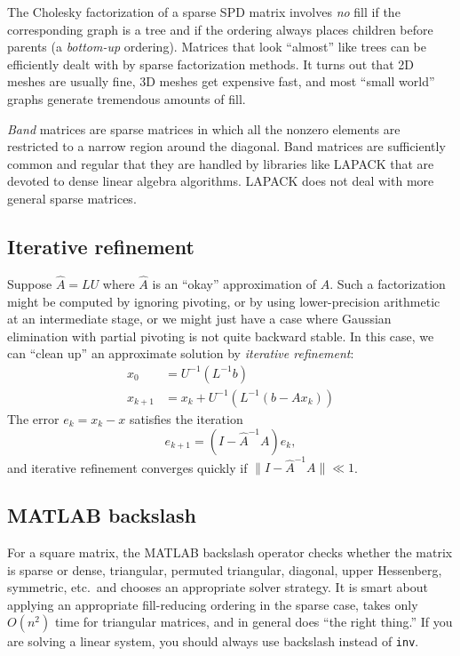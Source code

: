 \documentclass[12pt, leqno]{article}
\begin{document}
The Cholesky factorization of a sparse SPD matrix involves {\em no}
fill if the corresponding graph is a tree and if the ordering
always places children before parents (a {\em bottom-up} ordering).
Matrices that look ``almost'' like trees can be efficiently dealt
with by sparse factorization methods.  It turns out that 2D meshes
are usually fine, 3D meshes get expensive fast, and most ``small
world'' graphs generate tremendous amounts of fill.

{\em Band} matrices are sparse matrices in which all the nonzero
elements are restricted to a narrow region around the diagonal.
Band matrices are sufficiently common and regular that they are
handled by libraries like LAPACK that are devoted to dense linear
algebra algorithms.  LAPACK does not deal with more general sparse
matrices.

\subsection{Iterative refinement}

Suppose $\hat{A} = LU$ where $\hat{A}$ is an ``okay'' approximation
of $A$.  Such a factorization might be computed by ignoring pivoting,
or by using lower-precision arithmetic at an intermediate stage,
or we might just have a case where Gaussian elimination with partial
pivoting is not quite backward stable.  In this case, we can ``clean
up'' an approximate solution by {\em iterative refinement}:
\begin{align*}
x_0 &= U^{-1} (L^{-1} b) \\
x_{k+1} &= x_k + U^{-1} (L^{-1} (b-Ax_k))
\end{align*}
The error $e_k = x_k-x$ satisfies the iteration
\[
  e_{k+1} = (I-\hat{A}^{-1} A) e_k,
\]
and iterative refinement converges quickly if
$\|I-\hat{A}^{-1} A\| \ll 1$.

\subsection{MATLAB backslash}

For a square matrix, the MATLAB backslash operator checks whether the
matrix is sparse or dense, triangular, permuted triangular, diagonal,
upper Hessenberg, symmetric, etc.~and chooses an appropriate solver
strategy.  It is smart about applying an appropriate fill-reducing
ordering in the sparse case, takes only $O(n^2)$ time for triangular
matrices, and in general does ``the right thing.''  If you are solving
a linear system, you should always use backslash instead of {\tt inv}.
\end{document}
